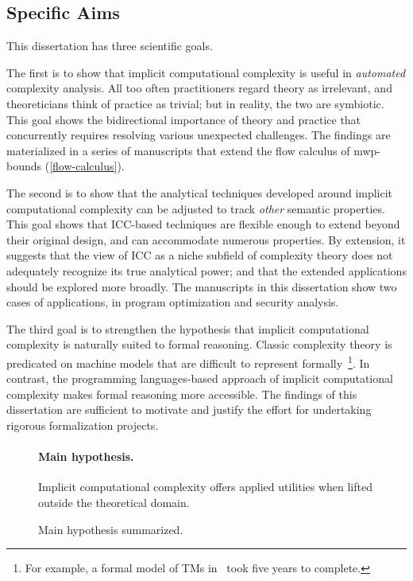 \subsection{Specific Aims}\label{subsec:specific-aims}

This dissertation has three scientific goals.

The first is to show that implicit computational complexity is useful in \emph{automated} complexity analysis.
All too often practitioners regard theory as irrelevant, and theoreticians think of practice as trivial;
but in reality, the two are symbiotic.
This goal shows the bidirectional importance of theory and practice that concurrently requires resolving various unexpected challenges. 
The findings are materialized in a series of manuscripts that extend the flow calculus of mwp-bounds (\autoref{flow-calculus}).

The second is to show that the analytical techniques developed around implicit computational complexity can be adjusted to track \emph{other} semantic properties.
This goal shows that ICC-based techniques are flexible enough to extend beyond their original design, and can accommodate numerous properties.
By extension, it suggests that the view of ICC as a niche subfield of complexity theory does not adequately recognize its true analytical power;
and that the extended applications should be explored more broadly.
The manuscripts in this dissertation show two cases of applications, in program optimization and security analysis.
 
The third goal is to strengthen the hypothesis that implicit computational complexity is naturally suited to formal reasoning.
Classic complexity theory is predicated on machine models that are difficult to represent formally~\footnote{
For example, a formal model of TMs in~\textcite{forster2020} took five years to complete.}.
In contrast, the programming languages-based approach of implicit computational complexity makes formal reasoning more accessible.
The findings of this dissertation are sufficient to motivate and justify the effort for undertaking rigorous formalization projects.

\begin{figure}[t]
\begin{mdframed}
\paragraph*{Main hypothesis.}
Implicit computational complexity offers applied utilities when lifted outside the theoretical domain.
\end{mdframed}
\caption[Main hypothesis summarized]
{Main hypothesis summarized.}
\label{fig:hypothesis}
\end{figure}

